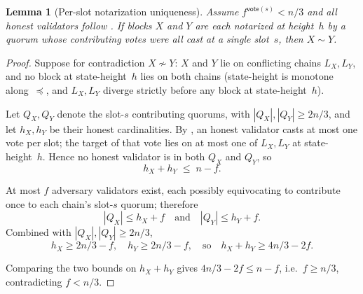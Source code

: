 \ifx\litemode\undefined\documentclass{article}\fi
\newcommand{\vote}{\mathsf{vote}}
\theoremstyle{plain}
\newtheorem{lemma}{Lemma}
\theoremstyle{definition}
\theoremstyle{remark}
\begin{document}
\begin{lemma}[Per-slot notarization uniqueness]\label{rev:lem:notar-unique-per-slot}
Assume $f^{\vote(s)} < n/3$ and all honest validators follow . If blocks $X$ and $Y$ are each notarized at height~$h$ by a quorum whose contributing votes were all cast at a single slot~$s$, then $X \sim Y$.
\end{lemma}

\begin{proof}
Suppose for contradiction $X \not\sim Y$: $X$ and $Y$ lie on conflicting chains $L_X, L_Y$, and no block at state-height~$h$ lies on both chains (state-height is monotone along~$\preceq$, and $L_X, L_Y$ diverge strictly before any block at state-height~$h$).

Let $Q_X, Q_Y$ denote the slot-$s$ contributing quorums, with $|Q_X|, |Q_Y| \geq 2n/3$, and let $h_X, h_Y$ be their honest cardinalities.
By , an honest validator casts at most one vote per slot; the target of that vote lies on at most one of $L_X, L_Y$ at state-height~$h$. Hence no honest validator is in both $Q_X$ and $Q_Y$, so
\[
  h_X + h_Y \;\leq\; n - f.
\]

At most $f$ adversary validators exist, each possibly equivocating to contribute once to each chain's slot-$s$ quorum; therefore
\[
  |Q_X| \leq h_X + f \quad\text{and}\quad |Q_Y| \leq h_Y + f.
\]
Combined with $|Q_X|, |Q_Y| \geq 2n/3$,
\[
  h_X \geq 2n/3 - f, \quad h_Y \geq 2n/3 - f, \quad\text{so}\quad h_X + h_Y \geq 4n/3 - 2f.
\]

Comparing the two bounds on $h_X + h_Y$ gives $4n/3 - 2f \leq n - f$, i.e.\ $f \geq n/3$, contradicting $f < n/3$.
\end{proof}
\end{document}
